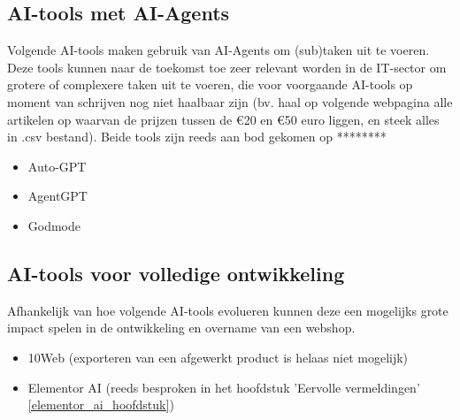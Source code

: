 \subsection{AI-tools met AI-Agents}
Volgende AI-tools maken gebruik van AI-Agents om (sub)taken uit te voeren. Deze tools kunnen naar de toekomst toe zeer relevant worden in de IT-sector om grotere of complexere taken uit te voeren, die voor voorgaande AI-tools op moment van schrijven nog niet haalbaar zijn (bv. haal op volgende webpagina alle artikelen op waarvan de prijzen tussen de €20 en €50 euro liggen, en steek alles in .csv bestand). Beide tools zijn reeds aan bod gekomen op ********
\begin{itemize}
    \item Auto-GPT
    \item AgentGPT
    \item Godmode
\end{itemize}

\subsection{AI-tools voor volledige ontwikkeling}
Afhankelijk van hoe volgende AI-tools evolueren kunnen deze een mogelijks grote impact spelen in de ontwikkeling en overname van een webshop. 
\begin{itemize}
    \item 10Web (exporteren van een afgewerkt product is helaas niet mogelijk)
    \item Elementor AI (reeds besproken in het hoofdstuk 'Eervolle vermeldingen' \ref{elementor_ai_hoofdstuk})
\end{itemize}    

